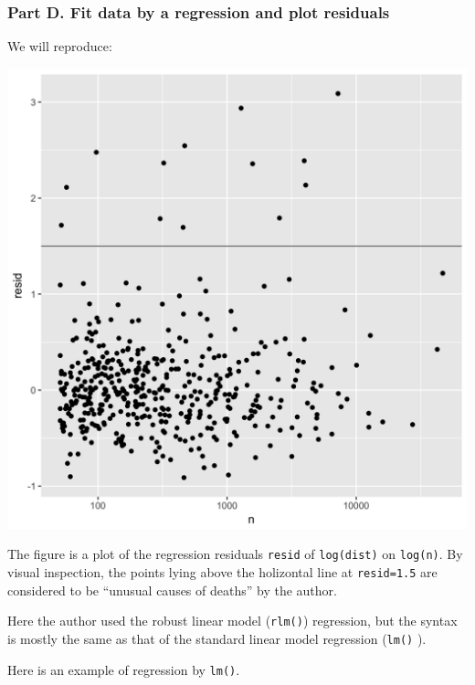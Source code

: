 \documentclass[]{book}
\newenvironment{Shaded}{\begin{snugshade}}{\end{snugshade}}
\newcommand{\KeywordTok}[1]{\textcolor[rgb]{0.13,0.29,0.53}{\textbf{{#1}}}}
\newcommand{\DataTypeTok}[1]{\textcolor[rgb]{0.13,0.29,0.53}{{#1}}}
\newcommand{\DecValTok}[1]{\textcolor[rgb]{0.00,0.00,0.81}{{#1}}}
\newcommand{\StringTok}[1]{\textcolor[rgb]{0.31,0.60,0.02}{{#1}}}
\newcommand{\OtherTok}[1]{\textcolor[rgb]{0.56,0.35,0.01}{{#1}}}
\newcommand{\NormalTok}[1]{{#1}}
\theoremstyle{definition}
\theoremstyle{definition}
\theoremstyle{remark}
\begin{document}
\subsubsection*{Part D. Fit data by a regression and plot
residuals}\label{part-d.-fit-data-by-a-regression-and-plot-residuals}

We will reproduce:

\begin{center}\includegraphics[width=0.5\linewidth]{tidy_case_study/n-dist-resid} \end{center}

The figure is a plot of the regression residuals \texttt{resid} of
\texttt{log(dist)} on \texttt{log(n)}. By visual inspection, the points
lying above the holizontal line at \texttt{resid=1.5} are considered to
be ``unusual causes of deaths'' by the author.

Here the author used the robust linear model (\texttt{rlm()})
regression, but the syntax is mostly the same as that of the standard
linear model regression (\texttt{lm()} ).

Here is an example of regression by \texttt{lm()}.

\begin{Shaded}
\end{Shaded}
\end{document}
